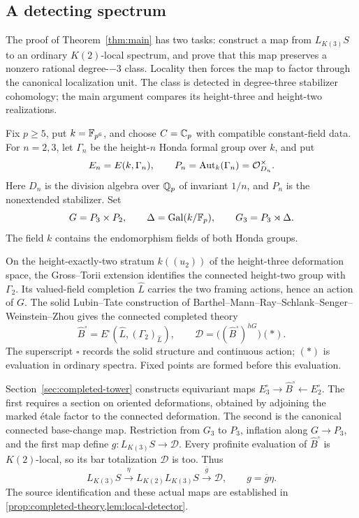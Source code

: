 \subsection{A detecting spectrum}

The proof of Theorem~\ref{thm:main} has two tasks: construct a map
from \(L_{K(3)}S\) to an ordinary \(K(2)\)-local spectrum, and prove
that this map preserves a nonzero rational degree-\(-3\) class. Locality
then forces the map to factor through the canonical localization unit.
The class is detected in degree-three stabilizer cohomology; the main
argument compares its height-three and height-two realizations.

Fix \(p\geq5\), put \(k=\mathbb F_{p^6}\), and choose \(C=\mathbb C_p\) with
compatible constant-field data. For \(n=2,3\), let \(\Gamma_n\) be the
height-\(n\) Honda formal group over \(k\), and put
\[
 E_n=E(k,\Gamma_n),\qquad
 P_n=\operatorname{Aut}_k(\Gamma_n)=\mathcal O_{D_n}^{\times}.
\]
Here \(D_n\) is the division algebra over \(\mathbb Q_p\) of invariant
\(1/n\), and \(P_n\) is the nonextended stabilizer. Set
\[
 G=P_3\times P_2,\qquad
 \Delta=\operatorname{Gal}(k/\mathbb F_p),\qquad G_3=P_3\rtimes\Delta.
\]
The field \(k\) contains the endomorphism fields of both Honda groups.

On the height-exactly-two stratum \(k((u_2))\) of the height-three
deformation space, the Gross--Torii extension identifies the connected
height-two group with \(\Gamma_2\). Its valued-field completion
\(\widehat L\) carries the two framing actions, hence an action of
\(G\). The solid Lubin--Tate construction of
Barthel--Mann--Ray--Schlank--Senger--Weinstein--Zhou \cite{BMR2026}
gives the connected completed theory
\[
 \widehat B^\square=E^\square(\widehat L,(\Gamma_2)_{\widehat L}),
 \qquad \mathcal D=\bigl((\widehat B^\square)^{hG}\bigr)(*).
\]
The superscript \(\square\) records the solid structure and continuous
action; \((*)\) is evaluation in ordinary spectra. Fixed points are
formed before this evaluation.

Section~\ref{sec:completed-tower} constructs equivariant maps
\(E_3^\square\to\widehat B^\square\leftarrow E_2^\square\).
The first requires a section on oriented deformations, obtained by
adjoining the marked \'etale factor to the connected deformation.
The second is the canonical connected base-change map. Restriction
from \(G_3\) to \(P_3\), inflation along \(G\to P_3\), and the first
map define \(g:L_{K(3)}S\to\mathcal D\). Every profinite evaluation
of \(\widehat B^\square\) is \(K(2)\)-local, so its bar totalization
\(\mathcal D\) is too. Thus
\begin{equation}\label{eq:overview-detector}
 L_{K(3)}S\xrightarrow{\eta}L_{K(2)}L_{K(3)}S
       \xrightarrow{\overline g}\mathcal D,
 \qquad g=\overline g\eta.
\end{equation}
The source identification and these actual maps are established in
\cref{prop:completed-theory,lem:local-detector}.

